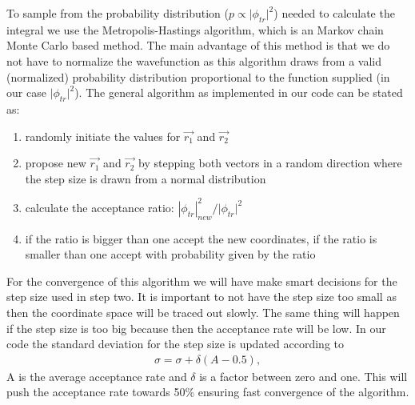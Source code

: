 To sample from the probability distribution (${p \propto |{\phi _{tr}}{|^2}}$) needed to calculate the integral we use the Metropolis-Hastings algorithm, which is an Markov chain Monte Carlo based method. The main advantage of this method is that we do not have to normalize the wavefunction as this algorithm draws from a valid (normalized) probability distribution proportional to the function supplied (in our case ${|{\phi _{tr}}{|^2}}$). The general algorithm as implemented in our code can be stated as:
\begin{enumerate}
\item randomly initiate the values for ${\overrightarrow {{r_1}} }$ and ${\overrightarrow {{r_2}} }$ 
\item  propose new ${\overrightarrow {{r_1}} }$ and ${\overrightarrow {{r_2}} }$ by stepping both vectors in a random direction where the step size is drawn from a normal distribution
\item calculate the acceptance ratio: $|{\phi _{tr}}|_{new}^2/|{\phi _{tr}}{|^2}$
\item if the ratio is bigger than one accept the new coordinates, if the ratio is smaller than one accept with probability given by the ratio
\end{enumerate}
For the convergence of this algorithm we will have make smart decisions for the step size used in  step two. It is important to not have the step size too small as then the coordinate space will be traced out slowly. The same thing will happen if the step size is too big because then the acceptance rate will be low. In our code the standard deviation for the step size is updated according to
\begin{align}
\sigma  = \sigma  + \delta  (A - 0.5),
\end{align}
A is the average acceptance rate and $\delta$ is a factor between zero and one. This will push the acceptance rate towards 50\% ensuring fast convergence of the algorithm.


